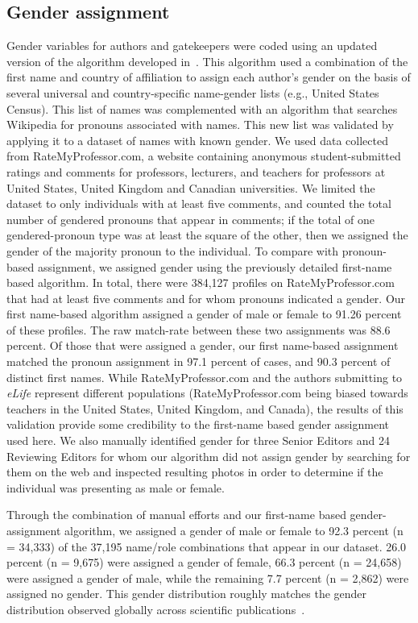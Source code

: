 \documentclass[10pt,letterpaper]{article}
\begin{document}
\subsection*{Gender assignment}
Gender variables for authors and gatekeepers were coded using an updated version of the algorithm developed in~\cite{lariviere_bibliometrics:_2013}. This algorithm used a combination of the first name and country of affiliation to assign each author’s gender on the basis of several universal and country-specific name-gender lists (e.g., United States Census). This list of names was complemented with an algorithm that searches Wikipedia for pronouns associated with names. This new list was validated by applying it to a dataset of names with known gender. We used data collected from RateMyProfessor.com, a website containing anonymous student-submitted ratings and comments for professors, lecturers, and teachers for professors at United States, United Kingdom and Canadian universities. We limited the dataset to only individuals with at least five comments, and counted the total number of gendered pronouns that appear in comments; if the total of one gendered-pronoun type was at least the square of the other, then we assigned the gender of the majority pronoun to the individual. To compare with pronoun-based assignment, we assigned gender using the previously detailed first-name based algorithm. In total, there were 384,127 profiles on RateMyProfessor.com that had at least five comments and for whom pronouns indicated a gender. Our first name-based algorithm assigned a gender of male or female to 91.26 percent of these profiles. The raw match-rate between these two assignments was 88.6 percent. Of those that were assigned a gender, our first name-based assignment matched the pronoun assignment in 97.1 percent of cases, and 90.3 percent of distinct first names. While RateMyProfessor.com and the authors submitting to \textit{eLife} represent different populations (RateMyProfessor.com being biased towards teachers in the United States, United Kingdom, and Canada), the results of this validation provide some credibility to the first-name based gender assignment used here. We also manually identified gender for three Senior Editors and 24 Reviewing Editors for whom our algorithm did not assign gender by searching for them on the web and inspected resulting photos in order to determine if the individual was presenting as male or female. 

Through the combination of manual efforts and our first-name based gender-assignment algorithm, we assigned a gender of male or female to 92.3 percent (n = 34,333) of the 37,195 name/role combinations that appear in our dataset. 26.0 percent (n = 9,675) were assigned a gender of female, 66.3 percent (n = 24,658) were assigned a gender of male, while the remaining 7.7 percent (n = 2,862) were assigned no gender. This gender distribution roughly matches the gender distribution observed globally across scientific publications~\cite{lariviere_bibliometrics:_2013}.
\end{document}
